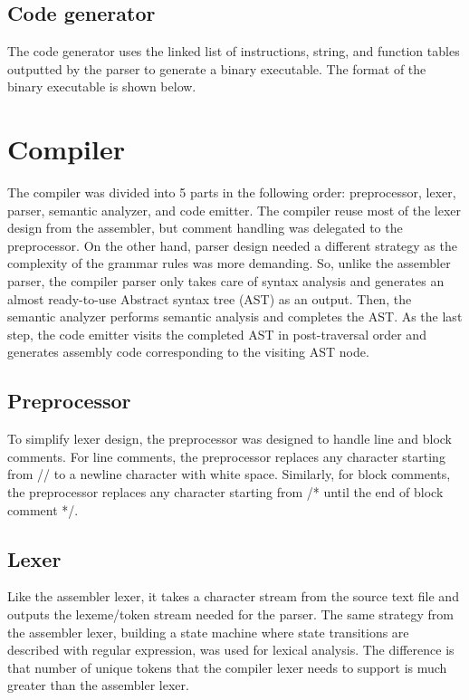 \documentclass[manuscript,screen,nonacm]{acmart}
\begin{document}
\subsection{Code generator}
The code generator uses the linked list of instructions, string, and function tables outputted by the parser to generate a binary executable. The format of the binary executable is shown below.


\section{Compiler}
The compiler was divided into 5 parts in the following order: preprocessor, lexer, parser, semantic analyzer, and code emitter. The compiler reuse most of the lexer design from the assembler, but comment handling was delegated to the preprocessor. On the other hand, parser design needed a different strategy as the complexity of the grammar rules was more demanding. So, unlike the assembler parser, the compiler parser only takes care of syntax analysis and generates an almost ready-to-use Abstract syntax tree (AST) as an output. Then, the semantic analyzer performs semantic analysis and completes the AST. As the last step, the code emitter visits the completed AST in post-traversal order and generates assembly code corresponding to the visiting AST node.

\subsection{Preprocessor}
To simplify lexer design, the preprocessor was designed to handle line and block comments. For line comments, the preprocessor replaces any character starting from // to a newline character with white space. Similarly, for block comments, the preprocessor replaces any character starting from /* until the end of block comment */.

\subsection{Lexer}
Like the assembler lexer, it takes a character stream from the source text file and outputs the lexeme/token stream needed for the parser. The same strategy from the assembler lexer, building a state machine where state transitions are described with regular expression, was used for lexical analysis. The difference is that number of unique tokens that the compiler lexer needs to support is much greater than the assembler lexer.
\end{document}
